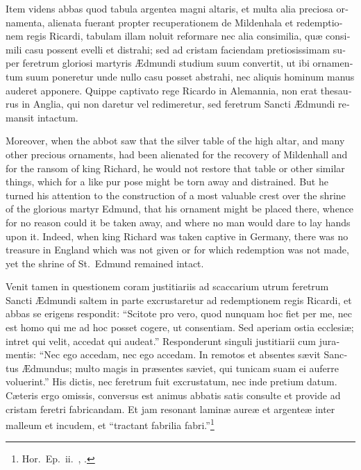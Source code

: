 \documentclass{book}
\begin{document}
\begin{paracol}{2}
\switchcolumn*

\begin{otherlanguage}{latin}
Item videns abbas quod tabula argentea magni altaris, et multa alia preciosa ornamenta, alienata fuerant propter recuperationem de Mildenhala et redemptionem regis Ricardi, tabulam illam noluit reformare nec alia consimilia, qu\ae{} consimili casu possent evelli et distrahi; sed ad cristam faciendam pretiosissimam super feretrum gloriosi martyris \AE{}dmundi studium suum convertit, ut ibi ornamentum suum poneretur unde nullo casu posset abstrahi, nec aliquis hominum manus auderet apponere. Quippe captivato rege Ricardo in Alemannia, non erat thesaurus in Anglia, qui non daretur vel redimeretur, sed feretrum Sancti \AE{}dmundi remansit intactum.
\end{otherlanguage}

\switchcolumn

Moreover, when the abbot saw that the silver table of the high altar, and many other precious ornaments, had been alienated for the recovery of Mildenhall and for the ransom of king Richard, he would not restore that table or other similar things, which for a like pur pose might be torn away and distrained. But he turned his attention to the construction of a most valuable crest over the shrine of the glorious martyr Edmund, that his ornament might be placed there, whence for no reason could it be taken away, and where no man would dare to lay hands upon it. Indeed, when king Richard was taken captive in Germany, there was no treasure in England which was not given or for which redemption was not made, yet the shrine of St.\ Edmund remained intact.

\switchcolumn*

\begin{otherlanguage}{latin}
Venit tamen in questionem coram justitiariis ad scaccarium utrum feretrum Sancti \AE{}dmundi saltem in parte excrustaretur ad redemptionem regis Ricardi, et abbas se erigens respondit: ``Scitote pro vero, quod nunquam hoc fiet per me, nec est homo qui me ad hoc posset cogere, ut consentiam. Sed aperiam ostia ecclesi\ae{}; intret qui velit, accedat qui audeat.'' Responderunt singuli justitiarii cum juramentis: ``Nec ego accedam, nec ego accedam. In remotos et absentes s\ae{}vit Sanctus \AE{}dmundus; multo magis in pr\ae{}sentes s\ae{}viet, qui tunicam suam ei auferre voluerint.'' His dictis, nec feretrum fuit excrustatum, nec inde pretium datum. C\ae{}teris ergo omissis, conversus est animus abbatis satis consulte et provide ad cristam feretri fabricandam. Et jam resonant lamin\ae{} aure\ae{} et argente\ae{} inter malleum et incudem, et ``tractant fabrilia fabri.''\footnote[\textdagger]{Hor.\ Ep.\ ii.\ , .}
\end{otherlanguage}


\end{paracol}
\end{document}
